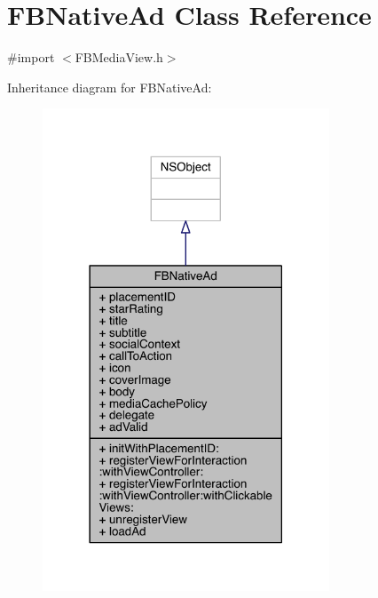 \hypertarget{interface_f_b_native_ad}{\section{F\-B\-Native\-Ad Class Reference}
\label{interface_f_b_native_ad}
}


{\ttfamily \#import $<$F\-B\-Media\-View.\-h$>$}



Inheritance diagram for F\-B\-Native\-Ad\-:
\nopagebreak
\begin{figure}[H]
\begin{center}
\leavevmode
\includegraphics[width=242pt]{interface_f_b_native_ad__inherit__graph}
\end{center}
\end{figure}


